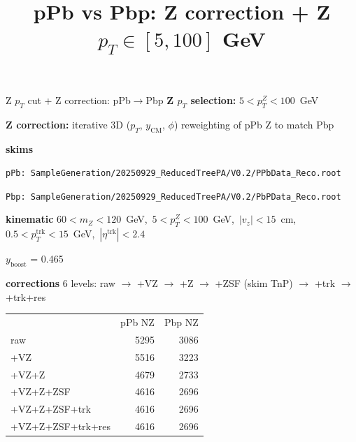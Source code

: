 \documentclass[aspectratio=169]{beamer}
\title{pPb vs Pbp: Z correction + Z $p_T \in [5, 100]$ GeV}
\date{}
\begin{document}
\begin{frame}
  \titlepage
\end{frame}

\begin{frame}[t]{Z $p_T$ cut + Z correction: pPb$\to$Pbp}
  \small
  \textbf{Z $p_T$ selection:} $5 < p_T^Z < 100$~GeV\par
  \vspace{0.3em}
  \textbf{Z correction:} iterative 3D ($p_T$, $y_\text{CM}$, $\phi$) reweighting of pPb Z to match Pbp\par
  \vspace{0.3em}
  \textbf{skims}\par
  {\scriptsize
  \texttt{pPb: SampleGeneration/20250929\_ReducedTreePA/V0.2/PPbData\_Reco.root}\par
  \texttt{Pbp: SampleGeneration/20250929\_ReducedTreePA/V0.2/PbPData\_Reco.root}\par}
  \vspace{0.3em}
  \textbf{kinematic} $60 < m_Z < 120$~GeV,\ $5 < p_T^Z < 100$~GeV,\ $|v_z| < 15$~cm,\ $0.5 < p_T^\text{trk} < 15$~GeV,\ $|\eta^\text{trk}| < 2.4$\par
  \vspace{0.3em}
  \textbf{$y_\text{boost}$} = 0.465\par
  \vspace{0.3em}
  \textbf{corrections} 6 levels: raw $\to$ +VZ $\to$ +Z $\to$ +ZSF (skim TnP) $\to$ +trk $\to$ +trk+res\par
  \vspace{0.3em}
  {\scriptsize
  \begin{tabular}{l r r}
              & pPb NZ    & Pbp NZ \\
  raw         & 5295      & 3086 \\
  +VZ         & 5516      & 3223 \\
  +VZ+Z       & 4679      & 2733 \\
  +VZ+Z+ZSF   & 4616      & 2696 \\
  +VZ+Z+ZSF+trk     & 4616      & 2696 \\
  +VZ+Z+ZSF+trk+res & 4616      & 2696 \\
  \end{tabular}}
\end{frame}
\end{document}
